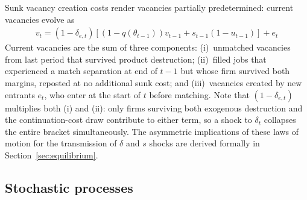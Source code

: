 \documentclass[authoryear, review, 12pt]{elsarticle}
\begin{document}
	Sunk vacancy creation costs render vacancies partially 
	predetermined: current vacancies evolve as
	\begin{align}
		v_{t}=(1-\delta_{e,t})[(1-q(\theta_{t-1}))v_{t-1}+
		s_{t-1}(1-u_{t-1})]+e_{t}\label{eq:v_lom}
	\end{align}
	Current vacancies are the sum of three components: 
	(i)~unmatched vacancies from last period that survived product destruction; 
	(ii)~filled jobs that experienced a match separation at end of 
	$t-1$ but whose firm survived both margins, reposted at no 
	additional sunk cost; and (iii)~vacancies created by new 
	entrants $e_t$, who enter at the start of $t$ before matching. 
	Note that $(1-\delta_{e,t})$ multiplies both (i) and (ii): 
	only firms surviving both exogenous destruction and the 
	continuation-cost draw contribute to either term, so a shock 
	to $\delta_t$ collapses the entire bracket simultaneously. The 
	asymmetric implications of these laws of motion for the 
	transmission of $\delta$ and $s$ shocks are derived formally 
	in Section~\ref{sec:equilibrium}.
	
	\subsection{Stochastic processes}
	
\end{document}
